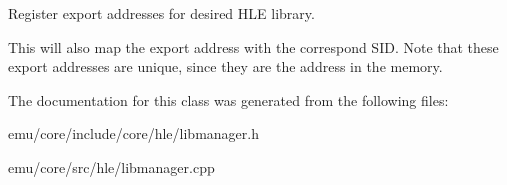 Register export addresses for desired H\+LE library. 

This will also map the export address with the correspond S\+ID. Note that these export addresses are unique, since they are the address in the memory. 

The documentation for this class was generated from the following files\+:\begin{DoxyCompactItemize}
\item 
emu/core/include/core/hle/libmanager.\+h\item 
emu/core/src/hle/libmanager.\+cpp\end{DoxyCompactItemize}
